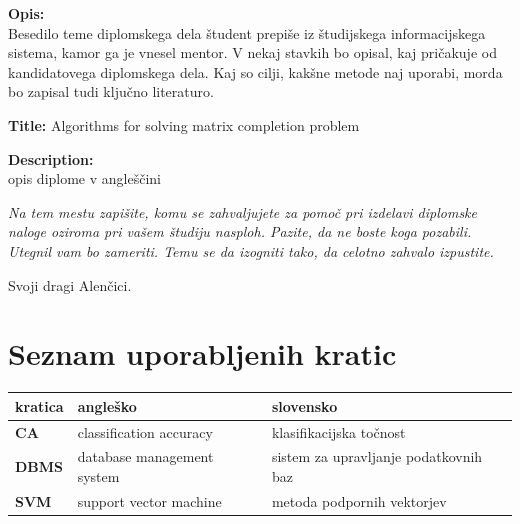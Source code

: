 \documentclass[a4paper,12pt,openright]{book}
\newcommand{\clearemptydoublepage}{\newpage{\pagestyle{empty}\cleardoublepage}}
\begin{document}
\bigskip
\noindent\textbf{Opis:}\\
Besedilo teme diplomskega dela študent prepiše iz študijskega informacijskega sistema, kamor ga je vnesel mentor. 
V nekaj stavkih bo opisal, kaj pričakuje od kandidatovega diplomskega dela. 
Kaj so cilji, kakšne metode naj uporabi, morda bo zapisal tudi ključno literaturo.

\bigskip
\noindent\textbf{Title:} Algorithms for solving matrix completion problem

\bigskip
\noindent\textbf{Description:}\\
opis diplome v angleščini

\vfill



\vspace{2cm}

\clearemptydoublepage

\thispagestyle{empty}\mbox{}\vfill\null\it%
\noindent
Na tem mestu zapišite, komu se zahvaljujete za pomoč pri izdelavi diplomske naloge oziroma pri vašem študiju nasploh. Pazite, da ne boste koga pozabili. Utegnil vam bo zameriti. Temu se da izogniti tako, da celotno zahvalo izpustite.
\rm\normalfont

\clearemptydoublepage

\thispagestyle{empty}\mbox{}{\textheight}\mbox{}\hfill\begin{minipage}{0.55\textwidth}%
Svoji dragi Alenčici.
\normalfont\end{minipage}

\clearemptydoublepage


\pagestyle{empty}
\def\thepage{}%
\tableofcontents{}


\clearemptydoublepage


\chapter*{Seznam uporabljenih kratic}

\noindent\begin{tabular}{p{}|p{}|p{}}    %
  {\bf kratica} & {\bf angleško}                              & {\bf slovensko} \\ \hline
  {\bf CA}      & classification accuracy               & klasifikacijska točnost \\
  {\bf DBMS} & database management system & sistem za upravljanje podatkovnih baz \\
  {\bf SVM}   & support vector machine              & metoda podpornih vektorjev \\
\end{tabular}
\end{document}

